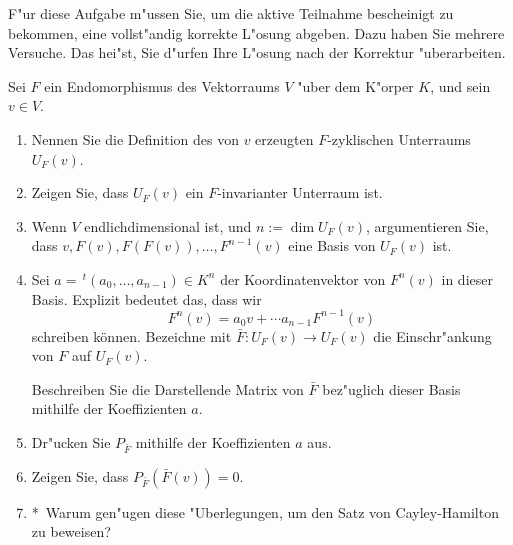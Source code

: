 \documentclass[a4,11pt]{article}
\begin{document}
\vspace*{-17mm}
{
\kopf
}




\begin{aufgabe}[Scheiblaboraufgabe]
F"ur diese Aufgabe m"ussen Sie, um die aktive Teilnahme bescheinigt zu
bekommen, eine vollst"andig korrekte L"osung abgeben.
Dazu haben Sie mehrere Versuche. Das hei"st, Sie d"urfen Ihre L"osung
nach der Korrektur "uberarbeiten.

  
Sei $F$ ein Endomorphismus des Vektorraums $V$ "uber dem K"orper $K$,
und sein $v \in V$.

\newcommand{\bonusitem}{\item\hspace*{-2.4mm}*\ }

  \begin{enumerate}
  \item Nennen Sie die Definition des von $v$ erzeugten
    $F$-zyklischen Unterraums $U_F(v)$.
  \item Zeigen Sie, dass $U_F(v)$ ein
    $F$-invarianter Unterraum ist.
  \item Wenn $V$ endlichdimensional ist, und $n := \dim U_F(v)$,
    argumentieren Sie, dass
    $v, F(v), F(F(v)), \ldots, F^{n-1}(v)$ eine
    Basis von $U_F(v)$ ist.
  \item Sei $a = \, ^t(a_0, \dots , a_{n-1}) \in K^n$ der
    Koordinatenvektor von $F^n(v)$ in dieser Basis. Explizit bedeutet das, dass wir
  \[
  F^n(v) = a_0 v + \cdots a_{n-1} F^{n-1}(v) 
  \]
  schreiben können. 
  Bezeichne mit $\bar F \colon U_F(v) \to U_F(v)$ die 
  Einschr"ankung von $F$ auf $U_F(v)$.
    
  Beschreiben Sie die Darstellende Matrix von $\bar F$ bez"uglich
  dieser Basis mithilfe der Koeffizienten $a$.
  \item Dr"ucken Sie $P_{\bar F}$ mithilfe der Koeffizienten $a$ aus.
  \item Zeigen Sie, dass $P_{\bar F}(\bar F(v)) = 0$.
  \bonusitem Warum gen"ugen diese "Uberlegungen, um den Satz von
    Cayley-Hamilton zu beweisen?
\end{enumerate}
\end{aufgabe}
\end{document}
